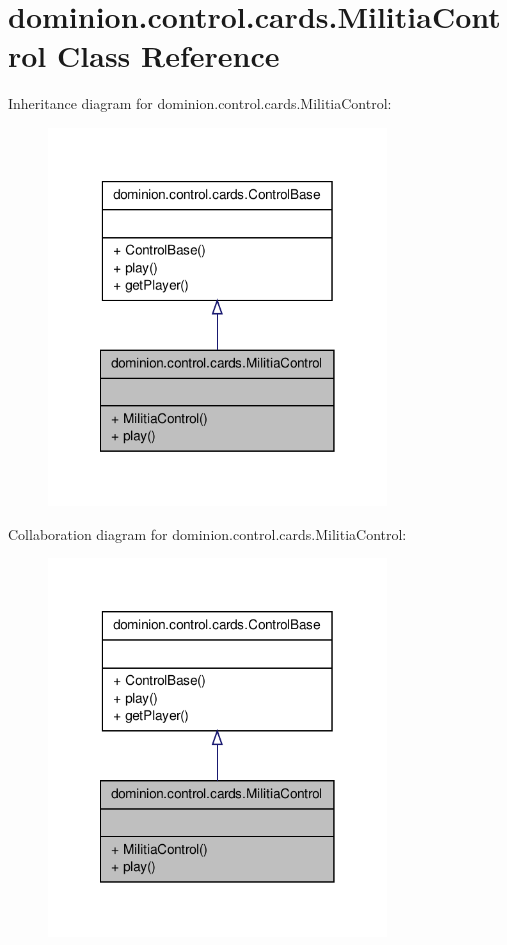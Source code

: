 \hypertarget{classdominion_1_1control_1_1cards_1_1MilitiaControl}{\section{dominion.\-control.\-cards.\-Militia\-Control \-Class \-Reference}
\label{classdominion_1_1control_1_1cards_1_1MilitiaControl}
}


\-Inheritance diagram for dominion.\-control.\-cards.\-Militia\-Control\-:
\nopagebreak
\begin{figure}[H]
\begin{center}
\leavevmode
\includegraphics[width=254pt]{classdominion_1_1control_1_1cards_1_1MilitiaControl__inherit__graph}
\end{center}
\end{figure}


\-Collaboration diagram for dominion.\-control.\-cards.\-Militia\-Control\-:
\nopagebreak
\begin{figure}[H]
\begin{center}
\leavevmode
\includegraphics[width=254pt]{classdominion_1_1control_1_1cards_1_1MilitiaControl__coll__graph}
\end{center}
\end{figure}
